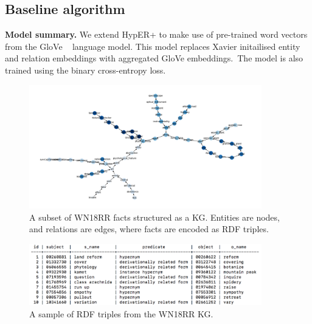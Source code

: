 \subsection{Baseline algorithm}
\textbf{Model summary.} We extend HypER+ to make use of pre-trained word vectors from the GloVe \unskip ~\citep{pennington2014glove} language model. This model replaces Xavier initailised entity and relation embeddings with aggregated GloVe embeddings.\ The model is also trained using the binary cross-entropy loss. 

\begin{figure}[H]
   	\centering
    	\includegraphics[width=0.9\textwidth, height=0.6\textwidth]{WN18RR_Graph}
	\caption{A subset of WN18RR facts structured as a KG. Entities are nodes, and relations are edges, where facts are encoded as RDF triples.}
\end{figure}

\bigskip
\bigskip
\bigskip

\begin{figure}[H]
   	\centering
    	\includegraphics[width=0.9\textwidth, height=0.3\textwidth]{wn18rr_fact_sample}
	\caption{A sample of RDF triples from the WN18RR KG.}
\end{figure}

